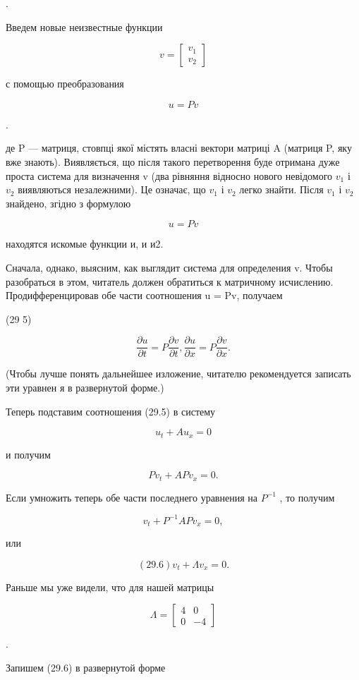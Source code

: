 \documentclass[
  ukrainian,
]{article}
\begin{document}
.

Введем новые неизвестные функции

\[
v =
\begin{bmatrix} v_1 \\ v_2 \end{bmatrix}
\]

с помощью преобразования

\[
u = Pv
\]

.

де P --- матриця, стовпці якої містять власні вектори матриці A (матриця
P, яку вже знають). Виявляється, що після такого перетворення буде
отримана дуже проста система для визначення v (два рівняння відносно
нового невідомого \(v_1\) і \(v_2\) виявляються незалежними). Це
означає, що \(v_1\) і \(v_2\) легко знайти. Після \(v_1\) і \(v_2\)
знайдено, згідно з формулою

\[
u = Pv
\]

находятся искомые функции и, и и2.

Сначала, однако, выясним, как выглядит система для определения v. Чтобы
разобраться в этом, читатель должен обратиться к матричному исчислению.
Продифференцировав обе части соотношения u = Pv, получаем

(29 5)

\[
\frac{\partial u}{\partial t} = P \frac{\partial v}{\partial t},
\frac{\partial u}{\partial x} = P \frac{\partial v}{\partial x}.
\]

(Чтобы лучше понять дальнейшее изложение, читателю рекомендуется
записать эти уравнен я в развернутой форме.)

Теперь подставим соотношения (29.5) в систему

\[
u_t + Au_x = 0
\]

и получим

\[
Pv_t + APv_x = 0.
\]

Если умножить теперь обе части последнего уравнения на \(P^{-1}\) , то
получим

\[
v_t + P^{-1}APv_x = 0,
\]

или

\[
(29.6) v_t + \Lambda v_x = 0.
\]

Раньше мы уже видели, что для нашей матрицы

\[
\Lambda =
\begin{bmatrix} 4 & 0 \\ 0 & -4 \end{bmatrix}
\]

.

Запишем (29.6) в развернутой форме
\end{document}
